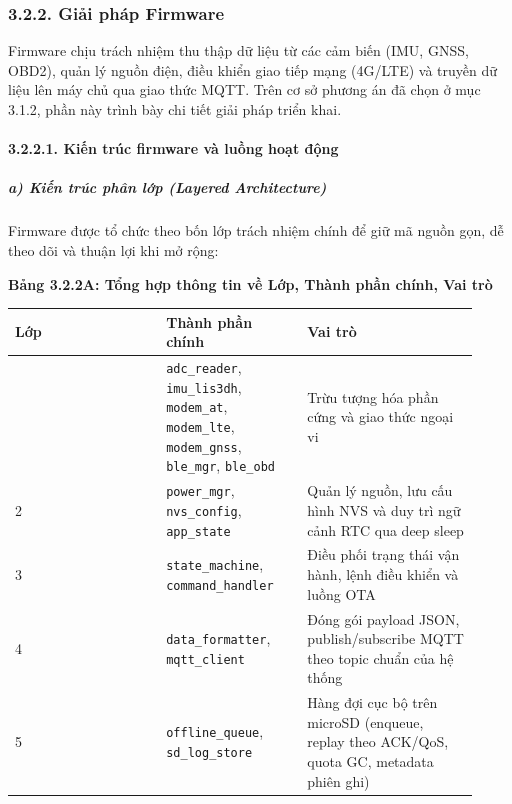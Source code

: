 \documentclass[13pt,a4paper]{extarticle}
\newcounter{none} %
\newcommand{\thesislongtableorignewline}{}
\let\thesislongtableorignewline\\
\renewcommand{\\}{\thesislongtableorignewline\hline}%
\let\\\thesislongtableorignewline
\newcommand{\thesistabletitle}[1]{%
  \begin{center}\textbf{#1}\end{center}%
}
\begin{document}
\subsubsection{3.2.2. Giải pháp
Firmware}\label{322-giux1ea3i-phuxe1p-firmware}

Firmware chịu trách nhiệm thu thập dữ liệu từ các cảm biến (IMU, GNSS,
OBD2), quản lý nguồn điện, điều khiển giao tiếp mạng (4G/LTE) và truyền
dữ liệu lên máy chủ qua giao thức MQTT. Trên cơ sở phương án đã chọn ở
mục 3.1.2, phần này trình bày chi tiết giải pháp triển khai.

\paragraph{3.2.2.1. Kiến trúc firmware và luồng hoạt
động}\label{3221-kiux1ebfn-truxfac-firmware-vuxe0-luux1ed3ng-houx1ea1t-ux111ux1ed9ng}

\subparagraph{a) Kiến trúc phân lớp (Layered
Architecture)}\label{a-kiux1ebfn-truxfac-phuxe2n-lux1edbp-layered-architecture}

Firmware được tổ chức theo bốn lớp trách nhiệm chính để giữ mã nguồn
gọn, dễ theo dõi và thuận lợi khi mở rộng:

{\def\LTcaptype{none} %
\thesistabletitle{Bảng 3.2.2A: Tổng hợp thông tin về Lớp, Thành phần chính, Vai trò}

\begin{longtable}{|p{0.30\linewidth}|p{0.28\linewidth}|p{0.34\linewidth}|}
\hline \textbf{Lớp} & \textbf{Thành phần chính} & \textbf{Vai trò} \\
\hline
\endhead
\hline
\endlastfoot
1 & \texttt{adc\_reader}, \texttt{imu\_lis3dh}, \texttt{modem\_at},
\texttt{modem\_lte}, \texttt{modem\_gnss}, \texttt{ble\_mgr},
\texttt{ble\_obd} & Trừu tượng hóa phần cứng và giao thức ngoại vi \\
2 & \texttt{power\_mgr}, \texttt{nvs\_config}, \texttt{app\_state} &
Quản lý nguồn, lưu cấu hình NVS và duy trì ngữ cảnh RTC qua deep
sleep \\
3 & \texttt{state\_machine}, \texttt{command\_handler} & Điều phối trạng
thái vận hành, lệnh điều khiển và luồng OTA \\
4 & \texttt{data\_formatter}, \texttt{mqtt\_client} & Đóng gói payload
JSON, publish/subscribe MQTT theo topic chuẩn của hệ thống \\
5 & \texttt{offline\_queue}, \texttt{sd\_log\_store} & Hàng đợi cục bộ
trên microSD (enqueue, replay theo ACK/QoS, quota GC, metadata phiên
ghi) \\
\end{longtable}
}
\end{document}
